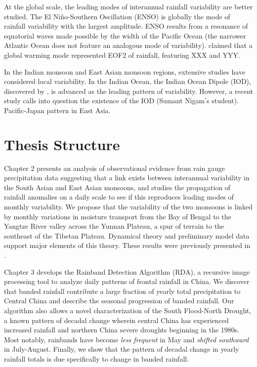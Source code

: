 	At the global scale, the leading modes of interannual rainfall variability are better studied. The El Ni\~no-Southern Oscillation (ENSO) is globally the mode of rainfall variability with the largest amplitude. ENSO results from a resonance of equatorial waves made possible by the width of the Pacific Ocean (the narrower Atlantic Ocean does not feature an analogous mode of variability). \cite{Dai} claimed that a global warming mode represented EOF2 of rainfall, featuring XXX and YYY. 	
	
	In the Indian monsoon and East Asian monsoon regions, extensive studies have considered local variability. In the Indian Ocean, the Indian Ocean Dipole (IOD), discovered by \cite{Goswami}, is advanced as the leading pattern of variability. However, a recent study calls into question the existence of the IOD (Sumant Nigam's student).
 Pacific-Japan pattern in East Asia.
 
 


\section{Thesis Structure}

Chapter 2 presents an analysis of observational evidence from rain gauge precipitation data suggesting that a link exists between interannual variability in the South Asian and East Asian monsoons, and studies the propagation of rainfall anomalies on a daily scale to see if this reproduces leading modes of monthly variability. We propose that the variability of the two monsoons is linked by monthly variations in moisture transport from the Bay of Bengal to the Yangtze River valley across the Yunnan Plateau, a spur of terrain to the southeast of the Tibetan Plateau. Dynamical theory and preliminary model data support major elements of this theory. These results were previously presented in \citep{Day2015}.

Chapter 3 develops the Rainband Detection Algorithm (RDA), a recursive image processing tool to analyze daily patterns of frontal rainfall in China. We discover that banded rainfall contribute a large fraction of yearly total precipitation to Central China and describe the seasonal progression of banded rainfall. Our algorithm also allows a novel characterization of the South Flood-North Drought, a known pattern of decadal change wherein central China has experienced increased rainfall and northern China severe droughts beginning in the 1980s. Most notably, rainbands have become \textit{less frequent} in May and \textit{shifted southward} in July-August. Finally, we show that the pattern of decadal change in yearly rainfall totals is due specifically to change in banded rainfall.

